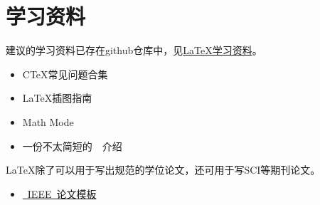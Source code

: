\chapter{学习资料}
\label{chap:material}

建议的学习资料已存在github仓库中，见\href{https://github.com/BIT-thesis/LaTeX-template/tree/master/LaTeX%E5%AD%A6%E4%B9%A0%E8%B5%84%E6%96%99}{LaTeX学习资料}。

\begin{itemize}
\item C\TeX 常见问题合集
\item \LaTeX 插图指南
\item Math Mode
\item 一份不太简短的~\LaTeXe{}~介绍

\end{itemize}

\LaTeX 除了可以用于写出规范的学位论文，还可用于写SCI等期刊论文。

\begin{itemize}
\item \href{http://www.ctan.org/tex-archive/macros/latex/contrib/IEEEtran/}{~IEEE~论文模板}

\end{itemize}